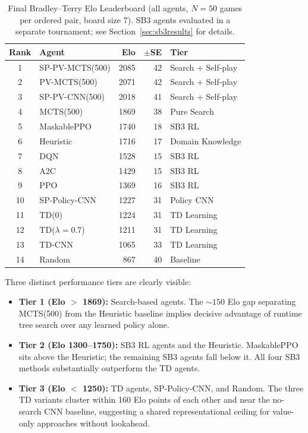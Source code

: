 \documentclass[conference]{IEEEtran}
\begin{document}
\begin{table}[h]
  \centering
  \caption{Final Bradley--Terry Elo Leaderboard (all agents, $N=50$ games per
    ordered pair, board size 7). SB3 agents evaluated in a separate tournament;
    see Section~\ref{sec:sb3results} for details.}
  \label{tab:elo_full}
  \renewcommand{\arraystretch}{1.15}
  \begin{tabular}{clrrl}
    \toprule
    \textbf{Rank} & \textbf{Agent} & \textbf{Elo} & \textbf{$\pm$SE} & \textbf{Tier} \\
    \midrule
    1  & SP-PV-MCTS(500)   & 2085 & 42 & Search + Self-play \\
    2  & PV-MCTS(500)      & 2071 & 42 & Search + Self-play \\
    3  & SP-PV-CNN(500)    & 2018 & 41 & Search + Self-play \\
    4  & MCTS(500)         & 1869 & 38 & Pure Search        \\
    \midrule
    5  & MaskablePPO       & 1740 & 18 & SB3 RL             \\
    6  & Heuristic         & 1716 & 17 & Domain Knowledge   \\
    7  & DQN               & 1528 & 15 & SB3 RL             \\
    8  & A2C               & 1429 & 15 & SB3 RL             \\
    9  & PPO               & 1369 & 16 & SB3 RL             \\
    \midrule
    10 & SP-Policy-CNN     & 1227 & 31 & Policy CNN         \\
    11 & TD(0)             & 1224 & 31 & TD Learning        \\
    12 & TD($\lambda=0.7$) & 1211 & 31 & TD Learning        \\
    13 & TD-CNN            & 1065 & 33 & TD Learning        \\
    14 & Random            &  867 & 40 & Baseline           \\
    \bottomrule
  \end{tabular}
\end{table}

Three distinct performance tiers are clearly visible:
\begin{itemize}
  \item \textbf{Tier 1 (Elo $>$ 1869):} Search-based agents. The ${\sim}150$
    Elo gap separating MCTS(500) from the Heuristic baseline implies decisive advantage of runtime
    tree search over any learned policy alone.
  \item \textbf{Tier 2 (Elo 1300--1750):} SB3 RL agents and the Heuristic.
    MaskablePPO sits above the Heuristic; the remaining SB3 agents fall below
    it. All four SB3 methods substantially outperform the TD agents.
  \item \textbf{Tier 3 (Elo $<$ 1250):} TD agents, SP-Policy-CNN, and
    Random. The three TD variants cluster within 160 Elo points of each other
    and near the no-search CNN baseline, suggesting a shared representational
    ceiling for value-only approaches without lookahead.
\end{itemize}
\end{document}
